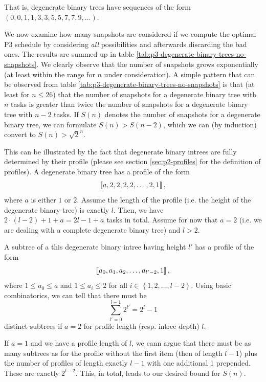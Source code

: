 That is, degenerate binary trees have sequences of the form $(0,0,1,1,3,3,5,5,7,7,9,\dots)$.

We now examine how many snapshots are considered if we compute the optimal P3 schedule by considering \emph{all} possibilities and afterwards discarding the bad ones. The results are summed up in table \ref{tab:p3-degenerate-binary-trees-no-snapshots}. We clearly observe that the number of snapshots grows exponentially (at least within the range for $n$ under consideration). A simple pattern that can be observed from table \ref{tab:p3-degenerate-binary-trees-no-snapshots} is that (at least for $n\leq 26$) that the number of snapshots for a degenerate binary tree with $n$ tasks is greater than twice the number of snapshots for a degenerate binary tree with $n-2$ tasks. If $S(n)$ denotes the number of snapshots for a degenerate binary tree, we can formulate $S(n)>S(n-2)$, which we can (by induction) convert to $S(n) > \sqrt 2 ^ n$.

This can be illustrated by the fact that degenerate binary intrees are fully determined by their profile (please see section \ref{sec:p2-profiles} for the definition of profiles). A degenerate binary tree has a profile of the form
\begin{equation*}
  \left\llbracket a,2,2,2,2,\dots,2,1 \right\rrbracket,
\end{equation*}
where $a$ is either $1$ or $2$. Assume the length of the profile (i.e. the height of the degenerate binary tree) is exactly $l$. Then, we have $2\cdot(l-2)+1+a = 2l-1+a$ tasks in total. Assume for now that $a=2$ (i.e. we are dealing with a complete degenerate binary tree) and $l>2$.

A subtree of a this degenerate binary intree having height $l'$ has a profile of the form
\begin{equation*}
  \left\llbracket a_0,a_1,a_2,\dots,a_{l'-2},1 \right\rrbracket,
\end{equation*}
where $1\leq a_0\leq a$ and $1\leq a_i \leq 2$ for all $i\in\left\{ 1,2,\dots,l-2 \right\}$. Using basic combinatorics, we can tell that there must be
\begin{equation*}
  \sum_{l'=0}^{l-1} 2^{l'} = 2^{l} -1
\end{equation*}
distinct subtrees if $a=2$ for profile length (resp. intree depth) $l$.

If $a=1$ and we have a profile length of $l$, we cann argue that there must be as many subtrees as for the profile without the first item (then of length $l-1$) plus the number of profiles of length exactly $l-1$ with one additional 1 prepended. These are exactly $2^{l-2}$. This, in total, leads to our desired bound for $S(n)$.

